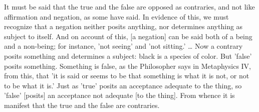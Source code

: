 \documentclass[]{article}
\begin{document}
It must be said that the true and the false are opposed as contraries, and not like affirmation and negation, as some have said. In evidence of this, we must recognize that a negation neither posits anything, nor determines anything as subject to itself. And on account of this, [a negation] can be said both of a being and a non-being; for instance, 'not seeing' and 'not sitting.' … Now a contrary posits something and determines a subject: black is a species of color. But 'false' posits something. Something is false, as the Philosopher says in Metaphysics IV, from this, that 'it is said or seems to be that something is what it is not, or not to be what it is.' Just as 'true' posits an acceptance adequate to the thing, so 'false' [posits] an acceptance not adequate [to the thing]. From whence it is manifest that the true and the false are contraries. 
\end{document}
